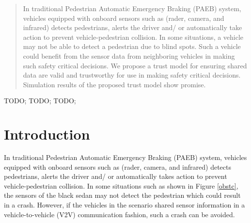 \documentclass[conference]{IEEEtran}
\begin{document}




\maketitle

\begin{abstract}
In traditional Pedestrian Automatic Emergency Braking (PAEB) system, vehicles equipped with onboard sensors such as (rader, camera, and infrared) detects pedestrians, alerts the driver and/ or automatically take action to prevent vehicle-pedestrian collision. In some situations, a vehicle may not be able to detect a pedestrian due to  blind spots. Such a vehicle could benefit from the sensor data from neighboring vehicles in making such safety critical decisions. We propose a trust model for ensuring shared data are valid and trustworthy for use in making safety critical decisions. Simulation results of the proposed trust model show promise.
\end{abstract}

\begin{IEEEkeywords}
TODO; TODO; TODO; 

\end{IEEEkeywords}




%
\IEEEpeerreviewmaketitle



\section{Introduction}
In traditional Pedestrian Automatic Emergency Braking (PAEB) system, vehicles equipped with onboard sensors such as (rader, camera, and infrared) detects pedestrians, alerts the driver and/ or automatically takes action to prevent vehicle-pedestrian collision. In some situations such as shown in Figure \ref{obstc}, the sensors of the black sedan may not detect the pedestrian which could result in a crash. However, if the vehicles in the scenario shared sensor information in a  vehicle-to-vehicle (V2V) communication fashion, such a crash can be avoided.
\end{document}
